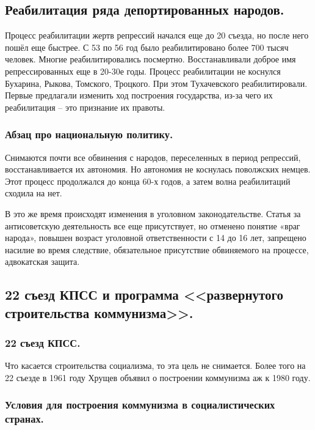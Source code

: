 \subsection{Реабилитация  ряда депортированных народов.}

Процесс реабилитации жертв репрессий начался еще до 20 съезда, но после него пошёл еще быстрее. С 53 по 56 год было реабилитировано более 700 тысяч человек. Многие реабилитировались посмертно. Восстанавливали доброе имя репрессированных еще в 20-30е годы. Процесс реабилитации не коснулся Бухарина, Рыкова, Томского, Троцкого. При этом Тухачевского реабилитировали. Первые предлагали изменить ход построения государства, из-за чего их реабилитация – это признание их правоты. 

\subsubsection{\textbf{Абзац про национальную политику.}}
Снимаются почти все обвинения с народов, переселенных в период репрессий, восстанавливается их автономия. Но автономия не коснулась поволжских немцев. Этот процесс продолжался до конца 60-х годов, а затем волна реабилитаций сходила на нет.

В это же время происходят изменения в уголовном законодательстве. Статья за антисоветскую деятельность все еще присутствует, но отменено понятие «враг народа», повышен возраст уголовной ответственности с 14 до 16 лет, запрещено насилие во время следствие, обязательное присутствие обвиняемого на процессе, адвокатская защита.

\subsection{22 съезд КПСС и программа <<развернутого строительства коммунизма>>.}

\subsubsection{\textbf{22 съезд КПСС.}}

Что касается строительства социализма, то эта цель не снимается. Более того на 22 съезде в 1961 году Хрущев объявил о построении коммунизма аж к 1980 году. 

\subsubsection{\textbf{Условия для построения коммунизма в социалистических странах.}}

